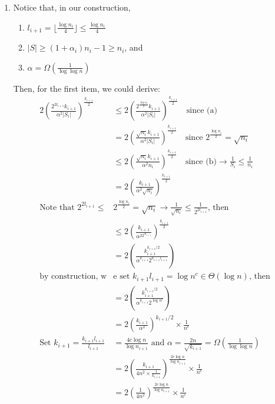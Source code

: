 \documentclass[letterpaper]{article} %
\begin{document}
	\begin{enumerate}
		\item Notice that, in our construction, 
		\begin{enumerate}
			\item $l_{i+1} = \lfloor\frac{\log n_i}{4}\rfloor\le\frac{\log n_i}{4}$
			\item $|S|\ge (1+\alpha_i)n_i-1\ge n_i$, and
			\item $\alpha = \Omega(\frac1{\log\log n})$
		\end{enumerate}
		Then, for the first item, we could derive:
		\begin{align*}
		2\left(\frac{2^{2l_{i+1}}k_{i+1}}{\alpha^2 |S_i|}\right)^{\frac{k_{i+1}}2}&\le 2\left(\frac{2^{\frac{\log n_i}{2}}k_{i+1}}{\alpha^2 |S_i|}\right)^{\frac{k_{i+1}}2}\quad\text{since (a)}\\
		& = 2\left(\frac{\sqrt{n_i}k_{i+1}}{\alpha^2 |S_i|}\right)^{\frac{k_{i+1}}2}\quad\text{since }2^{\frac{\log n_i}{2}} = \sqrt{n_i} \\
		& \le 2\left(\frac{\sqrt{n_i}k_{i+1}}{\alpha^2 n_i}\right)^{\frac{k_{i+1}}2}\quad\text{since (b)}\rightarrow\frac1{S_i}\le\frac1{n_i}\\
		& = 2\left(\frac{k_{i+1}}{\alpha^2\sqrt{n_i}}\right)^{\frac{k_{i+1}}2}\\
		\text{Note that }2^{2l_{i+1}}\le&2^{\frac{\log n_i}{2}} = \sqrt{n_i}\rightarrow \frac1{\sqrt{n_i}}\le\frac1{2^{2l_{i+1}}}\text{, then}\\
		& \le 2\left(\frac{k_{i+1}}{\alpha^22^{2l_{i+1}}}\right)^{\frac{k_{i+1}}2}\\
		& =  2\left(\frac{k_{i+1}^{k_{i+1}/2}}{\alpha^{k_{i+1}}2^{k_{i+1}l_{i+1}}}\right)\\
		\text{by construction, w}&\text{e set } k_{i+1}l_{i+1} = \log n^c \in \Theta(\log n )\text{, then}\\
		& =  2\left(\frac{k_{i+1}^{k_{i+1}/2}}{\alpha^{k_{i+1}}2^{\log n^c}}\right)\\
		& =  2\left(\frac{k_{i+1}}{\alpha^2}\right)^{k_{i+1}/2}\times\frac1{n^c}\\
		\text{Set } k_{i+1} = \frac{k_{i+1}l_{i+1}}{l_{i+1}}&=\frac{4c\log n}{\log n_{i+1}}\text{ and }\alpha = \frac{2n}{\sqrt{k_{i+1}}}=\Omega(\frac1{\log\log n})\\
		& = 2\left(\frac{k_{i+1}}{4n^2\times\frac1{k_{i+1}}}\right)^{\frac{2c\log n}{\log n_{i+1}}}\times\frac1{n^c}\\
		& = 2\left(\frac1{4n^2}\right)^{\frac{2c\log n}{\log n_{i+1}}}\times\frac1{n^c}\\

\end{align*}
\end{enumerate}
\end{document}
